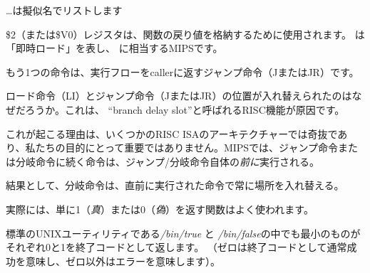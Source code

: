 \dots \IDA は擬似名でリストします



\$2（または\$V0）レジスタは、関数の戻り値を格納するために使用されます。 
は「即時ロード」を表し、 \MOV に相当するMIPSです。

もう1つの命令は、実行フローを\gls{caller}に返すジャンプ命令（JまたはJR）です。

ロード命令（LI）とジャンプ命令（JまたはJR）の位置が入れ替えられたのはなぜだろうか。これは、 ``branch delay slot''と呼ばれる\ac{RISC}機能が原因です。

これが起こる理由は、いくつかのRISC \ac{ISA}のアーキテクチャーでは奇抜であり、私たちの目的にとって重要ではありません。MIPSでは、ジャンプ命令または分岐命令に続く命令は、ジャンプ/分岐命令自体の\emph{前に}実行される。

結果として、分岐命令は、直前に実行された命令で常に場所を入れ替える。

実際には、単に1（\emph{真}）または0（\emph{偽}）を返す関数はよく使われます。

標準のUNIXユーティリティである\emph{/bin/true} と \emph{/bin/false}の中でも最小のものがそれぞれ0と1を終了コードとして返します。
（ゼロは終了コードとして通常成功を意味し、ゼロ以外はエラーを意味します）。

